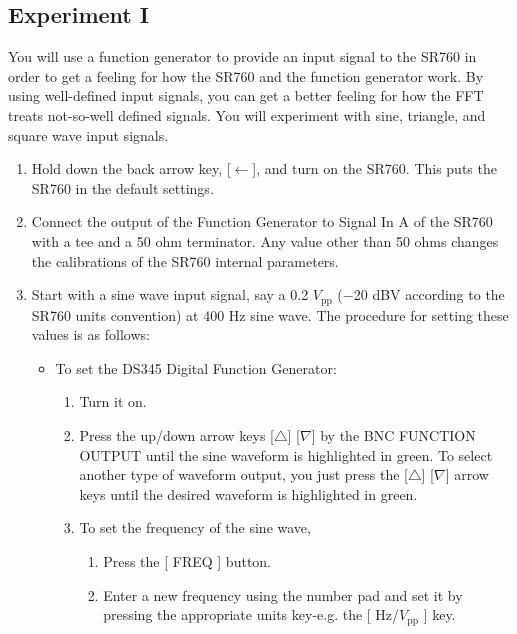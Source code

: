 \documentclass{../lab}
\begin{document}
\subsection{Experiment I}

You will use a function generator to provide an input signal to the SR760 in order to get a feeling for how the SR760 and the function generator work. By using well-defined input signals, you can get a better feeling for how the FFT treats not-so-well defined signals. You will experiment with sine, triangle, and square wave input signals.

\begin{enumerate}
    \item Hold down the back arrow key, [$\leftarrow$], and turn on the SR760. This puts the SR760 in the default settings.

    \item Connect the output of the Function Generator to Signal In A of the SR760 with a tee and a 50 ohm terminator. Any value other than 50 ohms changes the calibrations of the SR760 internal parameters.

    \item Start with a sine wave input signal, say a 0.2 $V_\text{pp}$ ($-$20 dBV according to the SR760 units convention) at 400 Hz sine wave. The procedure for setting these values is as follows:
    \begin{itemize}
        \item To set the DS345 Digital Function Generator:
        \begin{enumerate}
            \item Turn it on.

            \item Press the up/down arrow keys [$\triangle$] [$\nabla$] by the BNC FUNCTION OUTPUT until the sine waveform is highlighted in green. To select another type of waveform output, you just press the [$\triangle$] [$\nabla$] arrow keys until the desired waveform is highlighted in green.

            \item To set the frequency of the sine wave,
            \begin{enumerate}
                \item Press the [ FREQ ] button.

                \item Enter a new frequency using the number pad and set it by pressing the appropriate units key-e.g. the [ Hz/$V_\text{pp}$ ] key.


\end{enumerate}
\end{enumerate}
\end{itemize}
\end{enumerate}
\end{document}
